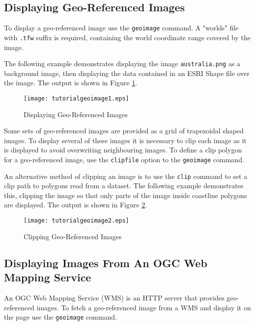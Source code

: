 \subsection{Displaying Geo-Referenced Images}

To display a geo-referenced image use the \texttt{geoimage} command.
A "worlds" file with \texttt{.tfw} suffix is required, containing
the world coordinate range covered by the image.

The following example demonstrates
displaying the image \texttt{australia.png} as a background image,
then displaying the data contained in an ESRI Shape file over the image.
The output is shown in Figure \ref{tutorialgeoimage1}.



\begin{figure}[htb]
\texttt{[image: tutorialgeoimage1.eps]}
\caption{Displaying Geo-Referenced Images}
\label{tutorialgeoimage1}
\end{figure}

Some sets of geo-referenced images are provided as a grid
of trapezoidal shaped images.
To display several of these images it is necessary to clip
each image as it is displayed to avoid overwriting neighbouring
images.  To define a clip polygon for a geo-referenced image, use
the \texttt{clipfile} option to the \texttt{geoimage} command.

An alternative method of clipping an image is to use the
\texttt{clip} command to set a clip path to polygons read from a dataset.
The following example demonstrates this, clipping the image so
that only parts of the image inside coastline polygons are displayed.
The output is shown in Figure \ref{tutorialgeoimage2}.



\begin{figure}[htb]
\texttt{[image: tutorialgeoimage2.eps]}
\caption{Clipping Geo-Referenced Images}
\label{tutorialgeoimage2}
\end{figure}

\subsection{Displaying Images From An OGC Web Mapping Service}

An OGC Web Mapping Service (WMS) is an HTTP server that provides
geo-referenced images.
To fetch a geo-referenced image from a WMS and display it
on the page use the \texttt{geoimage} command.

